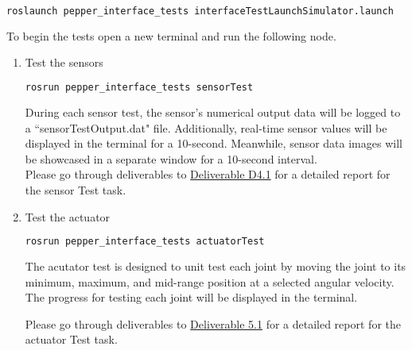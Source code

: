 \documentclass{CSSRforAfrica}
\begin{document}
{\begin{lstlisting}[style=withoutNumbering, language=bash]
roslaunch pepper_interface_tests interfaceTestLaunchSimulator.launch
\end{lstlisting}

\noindent To begin the tests open a new terminal and run the following node.
\begin{enumerate}

\item Test the sensors
\begin{lstlisting}[style=withoutNumbering, language=bash]
rosrun pepper_interface_tests sensorTest
\end{lstlisting}
During each sensor test, the sensor's numerical output data will be logged to a ``sensorTestOutput.dat" file. Additionally, real-time sensor values will be displayed in the terminal for a 10-second. Meanwhile, sensor data images will be showcased in a separate window for a 10-second interval.\\

Please go through deliverables to \href{https://cssr4africa.github.io/deliverables/CSSR4Africa_Deliverable_D4.1.pdf}
{Deliverable D4.1} for a detailed report for the sensor Test task.

\item Test the actuator
\begin{lstlisting}[style=withoutNumbering, language=bash]
rosrun pepper_interface_tests actuatorTest
\end{lstlisting}

The acutator test is designed to unit test each joint by moving the joint to its minimum, maximum, and mid-range position at a selected angular velocity. The progress for testing each joint will be displayed in the terminal. 

Please go through deliverables to \href{https://cssr4africa.github.io/deliverables/CSSR4Africa_Deliverable_D5.1.pdf}
{Deliverable 5.1} for a detailed report for the actuator Test task.

\end{enumerate}

\newpage


\newpage

}
\end{document}
